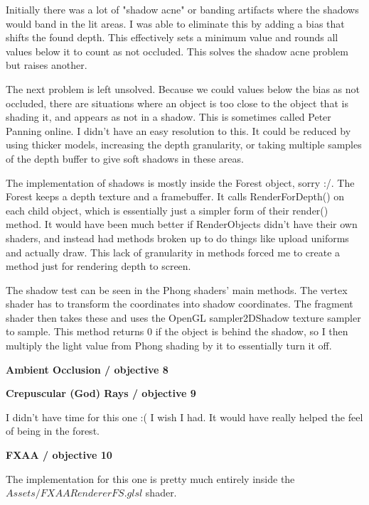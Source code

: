 \documentclass[10pt]{article}
\begin{document}
	Initially there was a lot of "shadow acne" or banding artifacts where the shadows would band in the lit areas. I was able to eliminate this by adding a bias that shifts the found depth. This effectively sets a minimum value and rounds all values below it to count as not occluded. This solves the shadow acne problem but raises another.
	
	The next problem is left unsolved. Because we could values below the bias as not occluded, there are situations where an object is too close to the object that is shading it, and appears as not in a shadow. This is sometimes called Peter Panning online. I didn't have an easy resolution to this. It could be reduced by using thicker models, increasing the depth granularity, or taking multiple samples of the depth buffer to give soft shadows in these areas.

	The implementation of shadows is mostly inside the Forest object, sorry :/. The Forest keeps a depth texture and a framebuffer. It calls RenderForDepth() on each child object, which is essentially just a simpler form of their render() method. It would have been much better if RenderObjects didn't have their own shaders, and instead had methods broken up to do things like upload uniforms and actually draw. This lack of granularity in methods forced me to create a method just for rendering depth to screen.
	
	The shadow test can be seen in the Phong shaders' main methods. The vertex shader has to transform the coordinates into shadow coordinates. The fragment shader then takes these and uses the OpenGL sampler2DShadow texture sampler to sample. This method returns 0 if the object is behind the shadow, so I then multiply the light value from Phong shading by it to essentially turn it off.
	
	\begin{center}
		\bf Ambient Occlusion / objective 8
	\end{center}
	
	\begin{center}
		\bf Crepuscular (God) Rays / objective 9
	\end{center}
	
	I didn't have time for this one :( I wish I had. It would have really helped the feel of being in the forest. 
	
	\begin{center}
		\bf FXAA / objective 10
	\end{center}
	
	The implementation for this one is pretty much entirely inside the $Assets/FXAARendererFS.glsl$ shader.
	
\end{document}
